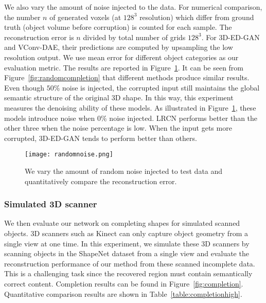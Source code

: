\documentclass[10pt,twocolumn,letterpaper]{article}
\begin{document}
We also vary the amount of noise injected to the data. For numerical comparison, the number $n$ of generated voxels (at $128^3$ resolution) which differ from ground truth (object volume before corruption) is counted for each sample. The reconstruction error is $n$ divided by total number of grids $128^3$. For 3D-ED-GAN and VConv-DAE, their predictions are computed by upsampling the low resolution output. We use mean error for different object categories as our evaluation metric. The results are reported in Figure~\ref{fig:randomnoise}.
It can be seen from Figure~\ref{fig:randomcompletion} that different methods produce similar results. Even though $50\%$ noise is injected, the corrupted input still maintains the global semantic structure of the original 3D shape. In this way, this experiment measures the denoising ability of these models. As illustrated in Figure~\ref{fig:randomnoise}, these models introduce noise when $0\%$ noise injected. LRCN performs better than the other three when the noise percentage is low. When the input gets more corrupted, 3D-ED-GAN tends to perform better than others.

\begin{figure}[t]
    \centering \texttt{[image: randomnoise.png]}
    \caption{We vary the amount of random noise injected to test data and quantitatively compare the reconstruction error.}
    \label{fig:randomnoise}
\end{figure}

\subsubsection{Simulated 3D scanner}

We then evaluate our network on completing shapes for simulated scanned objects. 3D scanners such as Kinect can only capture object geometry from a single view at one time. In this experiment, we simulate these 3D scanners by scanning objects in the ShapeNet dataset from a single view and evaluate the reconstruction performance of our method from these scanned incomplete data. This is a challenging task since the recovered region must contain semantically correct content. Completion results can be found in  Figure~\ref{fig:completion}. Quantitative comparison results are shown in Table~\ref{table:completionhigh}. 
\end{document}
